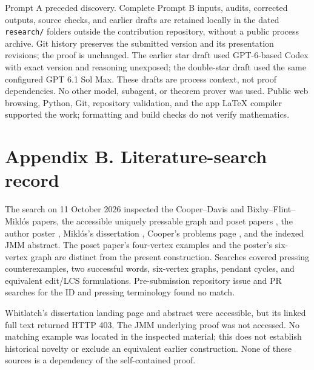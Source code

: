 \documentclass[11pt]{article}
\begin{document}
Prompt A preceded discovery. Complete Prompt B inputs, audits, corrected
outputs, source checks, and earlier drafts are retained locally in the
dated \texttt{research/} folders outside the contribution repository,
without a public process archive. Git history preserves the submitted
version and its presentation revisions; the proof is unchanged.
The earlier star draft used GPT-6-based Codex with exact version and
reasoning unexposed; the double-star draft used the same configured
GPT 6.1 Sol Max. These drafts are process context, not proof dependencies.
No other model, subagent, or theorem prover was used. Public web browsing,
Python, Git, repository validation, and the app LaTeX compiler supported
the work; formatting and build checks do not verify mathematics.

\section*{Appendix B. Literature-search record}
The search on 11 October 2026 inspected the Cooper--Davis and
Bixby--Flint--Mikl\'os papers, the accessible uniquely pressable graph
and poset papers \cite{unique,vposets}, the author poster \cite{poster},
Mikl\'os's dissertation \cite[Chapter 9, pp.~167--178]{miklosthesis},
Cooper's problems page \cite{problems}, and the indexed JMM abstract.
The poset paper's four-vertex examples and the poster's six-vertex graph
are distinct from the present construction. Searches covered pressing
counterexamples, two successful words, six-vertex graphs, pendant cycles,
and equivalent edit/LCS formulations. Pre-submission repository issue
and PR searches for the ID and pressing terminology found no match.

Whitlatch's dissertation landing page and abstract \cite{whitlatchthesis}
were accessible, but its linked full text returned HTTP 403. The JMM
underlying proof was not accessed. No matching example was located in
the inspected material; this does not establish historical novelty or
exclude an equivalent earlier construction. None of these sources is
a dependency of the self-contained proof.
\end{document}

